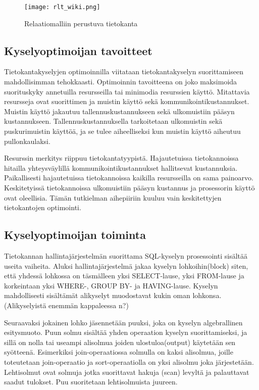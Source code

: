 \documentclass[finnish]{tktltiki2}
\theoremstyle{definition}
\theoremstyle{remark}
\begin{document}
\begin{figure}[!h]
  \caption{Relaatiomalliin perustuva tietokanta}
  \centering
    \texttt{[image: rlt\_wiki.png]}
\end{figure}

\subsection{Kyselyoptimoijan tavoitteet}
Tietokantakyselyjen optimoinnilla viitataan tietokantakyselyn suorittamiseen mahdollisimman tehokkaasti. Optimoinnin tavoitteena on joko maksimoida suorituskyky annetuilla resursseilla tai minimodia resurssien käyttö. Mitattavia resursseja ovat suorittimen ja muistin käyttö sekä kommunikointikustannukset. Muistin käyttö jakautuu tallennuskustannukseen sekä ulkomuistiin pääsyn kustannukseen. Tallennuskustannuksella tarkoitetaan ulkomuistin sekä puskurimuistin käyttöä, ja se tulee aiheelliseksi kun muistin käyttö aiheutuu pullonkaulaksi. 

Resurssin merkitys riippuu tietokantatyypistä. Hajautetuissa tietokannoissa hitailla yhteysväylillä kommunikointikustannukset hallitsevat kustannuksia. Paikallisesti hajautetuissa tietokannoissa kaikilla resursseilla on sama painoarvo. Keskitetyissä tietokannoissa ulkomuistiin pääsyn kustannus ja prosessorin käyttö ovat oleellisia. Tämän tutkielman aihepiiriin kuuluu vain keskitettyjen tietokantojen optimointi.
\subsection{Kyselyoptimoijan toiminta}
Tietokannan hallintajärjestelmän suorittama SQL-kyselyn prosessointi sisältää useita vaiheita. 
Aluksi hallintajärjestelmä jakaa kyselyn lohkoihin(block) siten, että yhdessä lohkossa on täsmälleen yksi SELECT-lause, yksi FROM-lause ja korkeintaan yksi WHERE-, GROUP BY- ja HAVING-lause. 
Kyselyn mahdollisesti sisältämät alikyselyt muodostavat kukin oman lohkonsa. %
(Alikyselyistä enemmän kappaleessa n?)

Seuraavaksi jokainen lohko jäsennetään puuksi, joka on kyselyn algebrallinen esitysmuoto.
Puun solmu sisältää yhden operaation kyselyn suorittamiseksi, ja sillä on nolla tai useampi alisolmua joiden ulostuloa(output) käytetään sen syötteenä.
Esimerkiksi join-operaatiossa solmulla on kaksi alisolmua, joille toteutetaan join-operaatio ja sort-operaatiolla on yksi alisolmu joka järjestetään.
Lehtisolmut ovat solmuja jotka suorittavat hakuja (scan) levyltä ja palauttavat saadut tulokset. \cite{mahajan2012}
Puu suoritetaan lehtisolmuista juureen.
\end{document}
